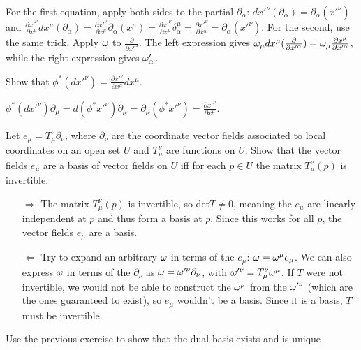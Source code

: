 {For the first equation, apply both sides to the partial $\partial_\alpha$: $dx'^\nu(\partial_\alpha)=
\partial_\alpha(x'^\nu)$ and $\frac{\partial x'^\nu}{\partial x^\mu}dx^\mu(\partial_\alpha)=
\frac{\partial x'^\nu}{\partial x^\mu}\partial_\alpha(x^\mu)=
\frac{\partial x'^\nu}{\partial x^\mu}\delta^\mu_\alpha=\frac{\partial x'^\nu}{\partial x^\alpha}=
\partial_\alpha(x'^\nu)$. For the second, use the same trick. Apply $\omega$ to 
$\frac{\partial}{\partial x'^\alpha}$. The left expression gives $\omega_\mu dx^\mu(\frac{\partial}{\partial x'^\alpha})=
\omega_\mu\frac{\partial x^\mu}{\partial x'^\alpha}$, while the right expression gives $\omega'_\alpha$.\\

\begin{p}{Show that $\phi^*(dx'^\nu)=\frac{\partial x'^\nu}{\partial x^\mu}dx^\mu$.}
\end{p}

$\phi^*(dx'^\nu)\partial_\mu=d(\phi^*x'^\nu)\partial_\mu=\partial_\mu(\phi^* x'^\nu)=\frac{\partial x'^\nu}{\partial x^\mu}$.

\begin{p}{Let $e_\mu=T^\nu_\mu\partial_\nu$, where $\partial_\nu$ are the coordinate vector fields associated to local coordinates on
an open set $U$ and $T^\nu_\mu$ are functions on $U$. Show that the vector fields $e_\mu$ are a basis of vector fields on $U$ iff for 
each $p\in U$ the matrix $T^\nu_\mu(p)$ is invertible.}
\end{p}

\begin{itemize}
\item[$\Rightarrow$] The matrix $T^\nu_\mu(p)$ is invertible, so det$T\neq 0$, meaning the $e_u$ are linearly independent at $p$ and thus 
form a basis at $p$. Since this works for all $p$, the vector fields $e_\mu$ are a basis. 
\item[$\Leftarrow$] Try to expand an arbitrary $\omega$ in terms of the $e_\mu$: $\omega=\omega^\mu e_\mu$. We can also express
$\omega$ in terms of the $\partial_\nu$ as $\omega=\omega'^\nu\partial_\nu$, with $\omega'^\nu= T^\nu_\mu \omega^\mu$. If $T$ were not invertible, 
we would not be able to construct the $\omega^\mu$ from the $\omega'^\nu$ (which are the ones guaranteed to exist), so $e_\mu$ wouldn't be 
a basis. Since it is a basis, $T$ must be invertible. 
\end{itemize}

\begin{p}{Use the previous exercise to show that the dual basis exists and is unique}
\end{p}

}
